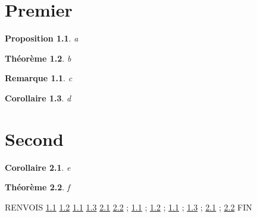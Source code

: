 \documentclass{scrbook}
\newtheorem{theoreme}{Théorème}[chapter]
\newtheorem{proposition}[theoreme]{Proposition}
\newtheorem{corollaire}[theoreme]{Corollaire}
\newtheorem{remarque}{Remarque}[chapter]
\begin{document}
\chapter{Premier}
\begin{proposition}\label{p1}a\end{proposition}
\begin{theoreme}\label{t1}b\end{theoreme}
\begin{remarque}\label{r1}c\end{remarque}
\begin{corollaire}\label{c1}d\end{corollaire}
\chapter{Second}
\begin{corollaire}\label{c2}e\end{corollaire}
\begin{theoreme}\label{t2}f\end{theoreme}
RENVOIS \ref{p1} \ref{t1} \ref{r1} \ref{c1} \ref{c2} \ref{t2} ; \cref{p1} ; \cref{t1} ; \cref{r1} ; \cref{c1} ; \cref{c2} ; \cref{t2} FIN
\end{document}
